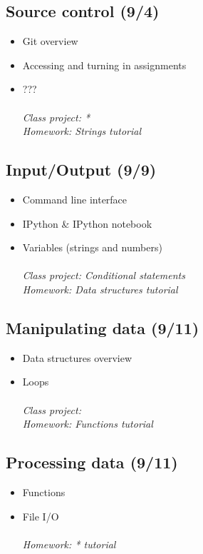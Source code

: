 \documentclass[12pt]{article}
\begin{document}
\subsection*{Source control \textnormal{\small{(9/4)} }}
\begin{itemize}
\item Git overview
\item Accessing and turning in assignments
\item ??? \\\\
\it{Class project: *}\\
\it{Homework: Strings tutorial}
\end{itemize}

\subsection*{Input/Output \textnormal{\small{(9/9)} }}
\begin{itemize}
\item Command line interface
\item IPython \& IPython notebook
\item Variables (strings and numbers) \\\\
\it{Class project: Conditional statements}\\
\it{Homework: Data structures tutorial}
\end{itemize}

\subsection*{Manipulating data \textnormal{\small{(9/11)} }}
\begin{itemize}
\item Data structures overview
\item Loops \\\\
\it{Class project: }\\
\it{Homework: Functions tutorial}
\end{itemize}

\subsection*{Processing data \textnormal{\small{(9/11)} }}
\begin{itemize}
\item Functions
\item File I/O \\\\
\it{Homework: * tutorial}
\end{itemize}
\end{document}
